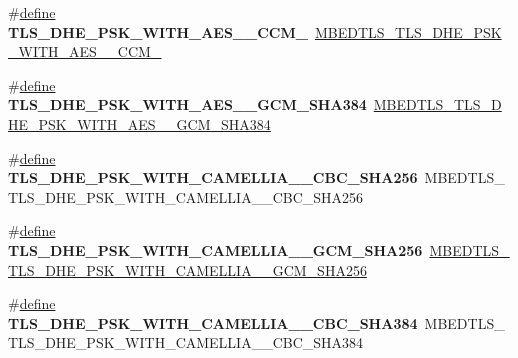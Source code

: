\begin{DoxyCompactItemize}
\#\hyperlink{structdefine}{define} {\bfseries T\+L\+S\+\_\+\+D\+H\+E\+\_\+\+P\+S\+K\+\_\+\+W\+I\+T\+H\+\_\+\+A\+E\+S\+\_\+\_\+\+C\+C\+M\+\_}~\hyperlink{ssl__ciphersuites_8h_a8d48af8d31ec02873ae89e2a2a349acd}{M\+B\+E\+D\+T\+L\+S\+\_\+\+T\+L\+S\+\_\+\+D\+H\+E\+\_\+\+P\+S\+K\+\_\+\+W\+I\+T\+H\+\_\+\+A\+E\+S\+\_\+\_\+\+C\+C\+M\+\_}
\item 
\mbox{\label{compat-1_83_8h_afc2b96f747189bd28f69f02269328a58}} 
\#\hyperlink{structdefine}{define} {\bfseries T\+L\+S\+\_\+\+D\+H\+E\+\_\+\+P\+S\+K\+\_\+\+W\+I\+T\+H\+\_\+\+A\+E\+S\+\_\+\_\+\+G\+C\+M\+\_\+\+S\+H\+A384}~\hyperlink{ssl__ciphersuites_8h_abe30e480a57b6b7c9bfae81503e310d9}{M\+B\+E\+D\+T\+L\+S\+\_\+\+T\+L\+S\+\_\+\+D\+H\+E\+\_\+\+P\+S\+K\+\_\+\+W\+I\+T\+H\+\_\+\+A\+E\+S\+\_\+\_\+\+G\+C\+M\+\_\+\+S\+H\+A384}
\item 
\mbox{\label{compat-1_83_8h_ab066e663b33dab8a0f129f3d099b9709}} 
\#\hyperlink{structdefine}{define} {\bfseries T\+L\+S\+\_\+\+D\+H\+E\+\_\+\+P\+S\+K\+\_\+\+W\+I\+T\+H\+\_\+\+C\+A\+M\+E\+L\+L\+I\+A\+\_\+\_\+\+C\+B\+C\+\_\+\+S\+H\+A256}~M\+B\+E\+D\+T\+L\+S\+\_\+\+T\+L\+S\+\_\+\+D\+H\+E\+\_\+\+P\+S\+K\+\_\+\+W\+I\+T\+H\+\_\+\+C\+A\+M\+E\+L\+L\+I\+A\+\_\+\_\+\+C\+B\+C\+\_\+\+S\+H\+A256
\item 
\mbox{\label{compat-1_83_8h_ae923d24b17aff8b1e9813e145cabb68e}} 
\#\hyperlink{structdefine}{define} {\bfseries T\+L\+S\+\_\+\+D\+H\+E\+\_\+\+P\+S\+K\+\_\+\+W\+I\+T\+H\+\_\+\+C\+A\+M\+E\+L\+L\+I\+A\+\_\+\_\+\+G\+C\+M\+\_\+\+S\+H\+A256}~\hyperlink{ssl__ciphersuites_8h_a39dccefc320d51ab8a75a685cc2518fd}{M\+B\+E\+D\+T\+L\+S\+\_\+\+T\+L\+S\+\_\+\+D\+H\+E\+\_\+\+P\+S\+K\+\_\+\+W\+I\+T\+H\+\_\+\+C\+A\+M\+E\+L\+L\+I\+A\+\_\+\_\+\+G\+C\+M\+\_\+\+S\+H\+A256}
\item 
\mbox{\label{compat-1_83_8h_a5674addff7499f07a9934909cae3e58f}} 
\#\hyperlink{structdefine}{define} {\bfseries T\+L\+S\+\_\+\+D\+H\+E\+\_\+\+P\+S\+K\+\_\+\+W\+I\+T\+H\+\_\+\+C\+A\+M\+E\+L\+L\+I\+A\+\_\+\_\+\+C\+B\+C\+\_\+\+S\+H\+A384}~M\+B\+E\+D\+T\+L\+S\+\_\+\+T\+L\+S\+\_\+\+D\+H\+E\+\_\+\+P\+S\+K\+\_\+\+W\+I\+T\+H\+\_\+\+C\+A\+M\+E\+L\+L\+I\+A\+\_\+\_\+\+C\+B\+C\+\_\+\+S\+H\+A384
\item 
\mbox{\label{compat-1_83_8h_a131d79c1f993c51a17d6400ad1fb8c00}} 

\end{DoxyCompactItemize}
